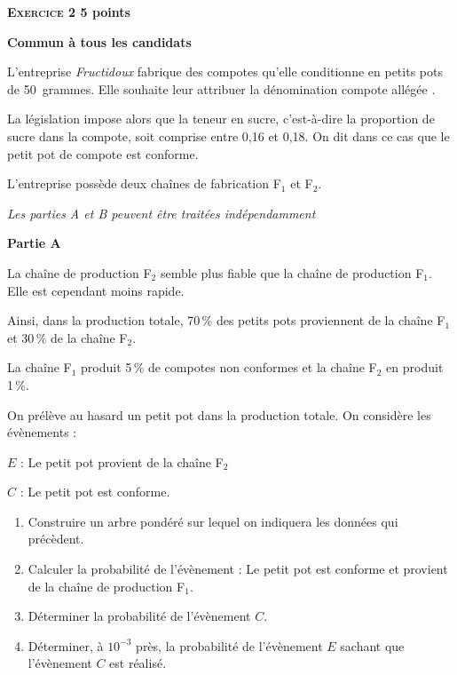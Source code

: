 \documentclass[10pt]{article}
\begin{document}
\vspace{0,5cm}

\textbf{\textsc{Exercice 2} \hfill 5 points}

\textbf{Commun à tous les candidats}
 
\medskip

L'entreprise \emph{Fructidoux} fabrique des compotes qu'elle conditionne en petits pots de 50~grammes. Elle souhaite leur attribuer la dénomination \og compote allégée \fg. 

La législation impose alors que la teneur en sucre, c'est-à-dire la proportion de sucre dans la compote, soit comprise entre 0,16 et 0,18. On dit dans ce cas que le petit pot de compote est conforme.
 
L'entreprise possède deux chaînes de fabrication F$_{1}$ et F$_{2}$.

\medskip
 
\emph{Les parties A et B peuvent être traitées indépendamment}

\medskip
 
\textbf{Partie A}

\medskip
 
La chaîne de production F$_{2}$ semble plus fiable que la chaîne de production F$_{1}$. Elle est cependant moins rapide.
 
Ainsi, dans la production totale, 70\,\% des petits pots proviennent de la chaîne F$_{1}$ et 30\,\% de la chaîne F$_{2}$.
 
La chaîne F$_{1}$ produit 5\,\% de compotes non conformes et la chaîne F$_{2}$ en produit 1\,\%.
 
On prélève au hasard un petit pot dans la production totale. On considère les évènements :
 
$E$ : \og Le petit pot provient de la chaîne F$_{2}$ \fg 

$C$ : \og Le petit pot est conforme. \fg

\medskip
 
\begin{enumerate}
\item Construire un arbre pondéré sur lequel on indiquera les données qui précèdent. 
\item Calculer la probabilité de l'évènement : \og Le petit pot est conforme et provient de la chaîne de production F$_{1}$. \fg 
\item Déterminer la probabilité de l'évènement $C$. 
\item Déterminer, à $10^{-3}$ près, la probabilité de l'évènement $E$ sachant que l'évènement $C$ est réalisé.
\end{enumerate}
\end{document}
